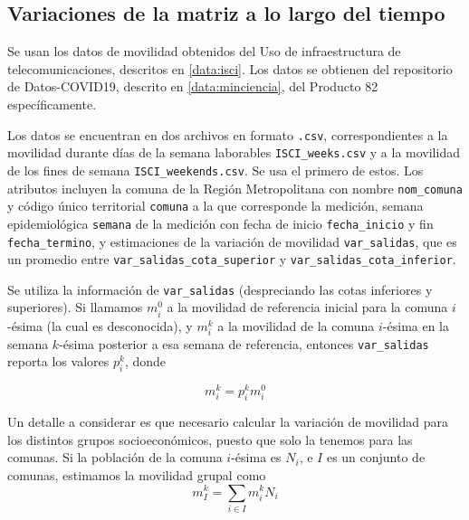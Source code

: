 


\subsection{Variaciones de la matriz a lo largo del tiempo} 

Se usan los datos de movilidad obtenidos del Uso de infraestructura de telecomunicaciones, descritos en \ref{data:isci}. Los datos se obtienen del repositorio de Datos-COVID19, descrito en \ref{data:minciencia}, del Producto 82 específicamente. 

Los datos se encuentran en dos archivos en formato \texttt{.csv}, correspondientes a la movilidad durante días de la semana laborables \texttt{ISCI\_weeks.csv} y a la movilidad de los fines de semana \texttt{ISCI\_weekends.csv}. Se usa el primero de estos. Los atributos incluyen la comuna de la Región Metropolitana con nombre \texttt{nom\_comuna} y código único territorial \texttt{comuna} a la que corresponde la medición, semana epidemiológica \texttt{semana} de la medición con fecha de inicio \texttt{fecha\_inicio} y fin \texttt{fecha\_termino}, y estimaciones de la variación de movilidad \texttt{var\_salidas}, que es un promedio entre \texttt{var\_salidas\_cota\_superior} y \texttt{var\_salidas\_cota\_inferior}. 

Se utiliza la información de \texttt{var\_salidas} (despreciando las cotas inferiores y superiores). Si llamamos \(m_i^0\) a la movilidad de referencia inicial para la comuna \(i\)-ésima (la cual es desconocida), y \(m_i^k\) a la movilidad de la comuna \(i\)-ésima en la semana \(k\)-ésima posterior a esa semana de referencia, entonces \texttt{var\_salidas} reporta los valores \(p_i^k\), donde 

\[
m_i^k = p_i^k m_i^0
\]

Un detalle a considerar es que necesario calcular la variación de movilidad para los distintos grupos socioeconómicos, puesto que solo la tenemos para las comunas. Si la población de la comuna \(i\)-ésima es \(N_i\), e \(I\) es un conjunto de comunas, estimamos la movilidad grupal como 
\[
m^k_I = \sum_{i \in I}m^k_i N_i
\]

